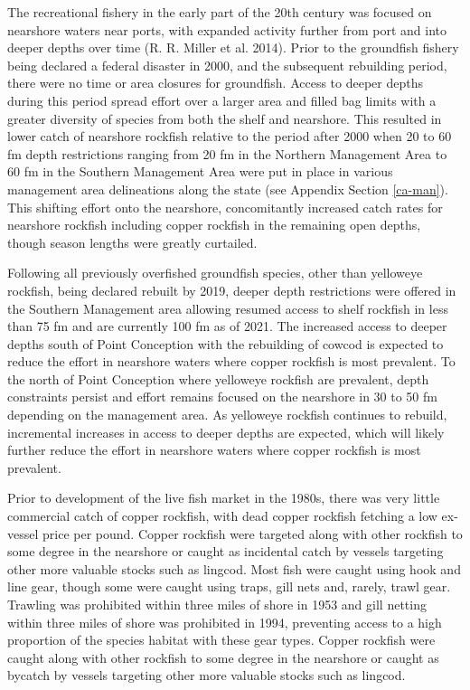 \documentclass[11pt,
  english,
  letterpaper,
]{article}
\begin{document}
The recreational fishery in the early part of the 20th century was focused on nearshore waters near ports, with expanded activity further from port and into deeper depths over time (R. R. Miller et al. 2014). Prior to the groundfish fishery being declared a federal disaster in 2000, and the subsequent rebuilding period, there were no time or area closures for groundfish. Access to deeper depths during this period spread effort over a larger area and filled bag limits with a greater diversity of species from both the shelf and nearshore. This resulted in lower catch of nearshore rockfish relative to the period after 2000 when 20 to 60 fm depth restrictions ranging from 20 fm in the Northern Management Area to 60 fm in the Southern Management Area were put in place in various management area delineations along the state (see Appendix Section \ref{ca-man}). This shifting effort onto the nearshore, concomitantly increased catch rates for nearshore rockfish including copper rockfish in the remaining open depths, though season lengths were greatly curtailed.

Following all previously overfished groundfish species, other than yelloweye rockfish, being declared rebuilt by 2019, deeper depth restrictions were offered in the Southern Management area allowing resumed access to shelf rockfish in less than 75 fm and are currently 100 fm as of 2021. The increased access to deeper depths south of Point Conception with the rebuilding of cowcod is expected to reduce the effort in nearshore waters where copper rockfish is most prevalent. To the north of Point Conception where yelloweye rockfish are prevalent, depth constraints persist and effort remains focused on the nearshore in 30 to 50 fm depending on the management area. As yelloweye rockfish continues to rebuild, incremental increases in access to deeper depths are expected, which will likely further reduce the effort in nearshore waters where copper rockfish is most prevalent.

Prior to development of the live fish market in the 1980s, there was very little commercial catch of copper rockfish, with dead copper rockfish fetching a low ex-vessel price per pound. Copper rockfish were targeted along with other rockfish to some degree in the nearshore or caught as incidental catch by vessels targeting other more valuable stocks such as lingcod. Most fish were caught using hook and line gear, though some were caught using traps, gill nets and, rarely, trawl gear. Trawling was prohibited within three miles of shore in 1953 and gill netting within three miles of shore was prohibited in 1994, preventing access to a high proportion of the species habitat with these gear types. Copper rockfish were caught along with other rockfish to some degree in the nearshore or caught as bycatch by vessels targeting other more valuable stocks such as lingcod.
\end{document}
